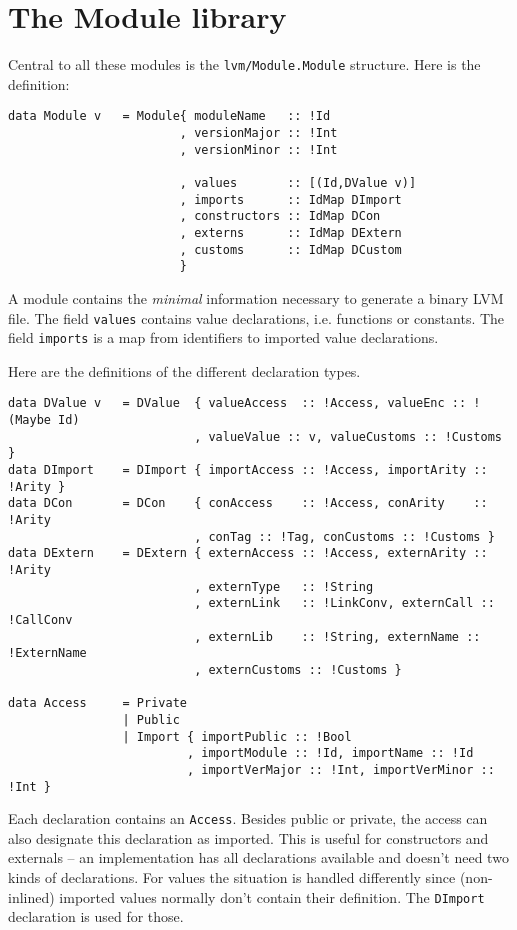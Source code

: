 \documentclass[a4]{article}
\newcommand{\code}[1]{\texttt{#1}}
\begin{document}
\section{The Module library}

Central to all these modules is the \code{lvm/Module.Module} structure. Here
is the definition:
\begin{verbatim}
data Module v   = Module{ moduleName   :: !Id
                        , versionMajor :: !Int
                        , versionMinor :: !Int

                        , values       :: [(Id,DValue v)]
                        , imports      :: IdMap DImport
                        , constructors :: IdMap DCon
                        , externs      :: IdMap DExtern
                        , customs      :: IdMap DCustom
                        }
 \end{verbatim}

A module contains the \emph{minimal} information necessary to generate
a binary LVM file. The field \code{values} contains value declarations,
i.e. functions or constants. The field \code{imports}
is a map from identifiers to imported value declarations.

Here are the definitions of the different declaration types.
\begin{verbatim}
data DValue v   = DValue  { valueAccess  :: !Access, valueEnc :: !(Maybe Id)
                          , valueValue :: v, valueCustoms :: !Customs }
data DImport    = DImport { importAccess :: !Access, importArity :: !Arity }
data DCon       = DCon    { conAccess    :: !Access, conArity    :: !Arity
                          , conTag :: !Tag, conCustoms :: !Customs }
data DExtern    = DExtern { externAccess :: !Access, externArity :: !Arity
                          , externType   :: !String
                          , externLink   :: !LinkConv, externCall :: !CallConv
                          , externLib    :: !String, externName :: !ExternName
                          , externCustoms :: !Customs }

data Access     = Private
                | Public
                | Import { importPublic :: !Bool
                         , importModule :: !Id, importName :: !Id
                         , importVerMajor :: !Int, importVerMinor :: !Int }
\end{verbatim}

Each declaration contains an \code{Access}. Besides public or private, the
access can also designate this declaration as imported. This is useful for
constructors and externals -- an implementation has all declarations available
and doesn't need two kinds of declarations. For values the situation is
handled differently since (non-inlined) imported values normally don't contain
their definition. The \code{DImport} declaration is used for those.
\end{document}
